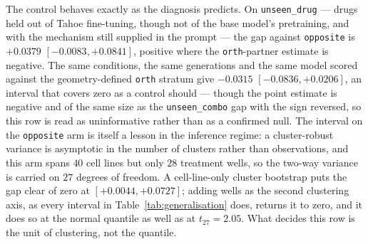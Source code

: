 The control behaves exactly as the diagnosis predicts. On \texttt{unseen\_drug} --- drugs held out
of Tahoe fine-tuning, though not of the base model's pretraining, and with the mechanism still
supplied in the prompt --- the gap against \texttt{opposite} is $+0.0379$
\nolinebreak[3]$[-0.0083, +0.0841]$, positive where the \texttt{orth}-partner estimate is negative. The same
conditions, the same generations and the same model scored against the geometry-defined
\texttt{orth} stratum give
$-0.0315$ \nolinebreak[3]$[-0.0836, +0.0206]$, an interval that covers zero as a control should ---
though the point estimate is negative and of the same size as the \texttt{unseen\_combo} gap with
the sign reversed, so this row is read as uninformative rather than as a confirmed null. The
interval on the \texttt{opposite} arm is itself a lesson in the inference regime: a cluster-robust
variance is asymptotic in the number of clusters rather than observations, and this arm spans $40$
cell lines but only $28$ treatment wells, so the two-way variance is carried on $27$ degrees of
freedom. A cell-line-only cluster bootstrap puts the gap clear of zero at $[+0.0044, +0.0727]$;
adding wells as the second clustering axis, as every interval in Table~\ref{tab:generalisation}
does, returns it to zero, and it does so at the normal quantile as well as at $t_{27} = 2.05$. What
decides this row is the unit of clustering, not the quantile.

